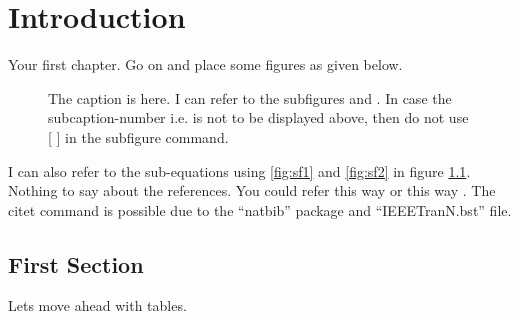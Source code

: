 \chapter{Introduction}
\label{ch:intro}

Your first chapter. Go on and place some figures as given below.
\begin{figure}[!ht]
 	\centering
 	\caption[Use this if required, which goes in `list of figures']{The caption is here. I can refer to the subfigures  and . In case the subcaption-number i.e.  is not to be displayed above, then do not use [ ] in the subfigure command.}
 	\label{fig:f1}
\end{figure}
 
I can also refer to the sub-equations using \ref{fig:sf1} and \ref{fig:sf2} in figure \ref{fig:f1}. Nothing to say about the references. You could refer this way \cite{areport,Hill,MATLAB} or this way \citet{Akyildiz}. The citet command is possible due to the ``natbib'' package and ``IEEETranN.bst'' file.

\section{First Section}
Lets move ahead with tables.

